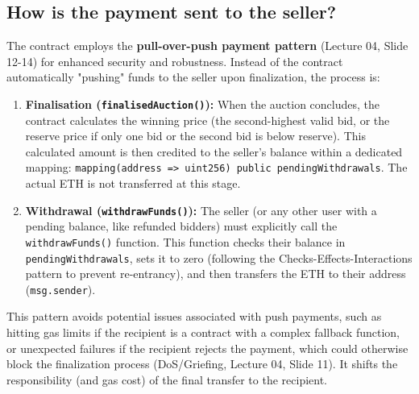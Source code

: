 \documentclass[11pt, a4paper]{article}
\begin{document}
\subsection{How is the payment sent to the seller?}
The contract employs the \textbf{pull-over-push payment pattern} (Lecture 04, Slide 12-14) for enhanced security and robustness. Instead of the contract automatically "pushing" funds to the seller upon finalization, the process is:
\begin{enumerate}
    \item \textbf{Finalisation (\texttt{finalisedAuction()}):} When the auction concludes, the contract calculates the winning price (the second-highest valid bid, or the reserve price if only one bid or the second bid is below reserve). This calculated amount is then credited to the seller's balance within a dedicated mapping: \texttt{mapping(address => uint256) public pendingWithdrawals}. The actual ETH is not transferred at this stage.
    \item \textbf{Withdrawal (\texttt{withdrawFunds()}):} The seller (or any other user with a pending balance, like refunded bidders) must explicitly call the \texttt{withdrawFunds()} function. This function checks their balance in \texttt{pendingWithdrawals}, sets it to zero (following the Checks-Effects-Interactions pattern to prevent re-entrancy), and then transfers the ETH to their address (\texttt{msg.sender}).
\end{enumerate}
This pattern avoids potential issues associated with push payments, such as hitting gas limits if the recipient is a contract with a complex fallback function, or unexpected failures if the recipient rejects the payment, which could otherwise block the finalization process (DoS/Griefing, Lecture 04, Slide 11). It shifts the responsibility (and gas cost) of the final transfer to the recipient.
\end{document}
